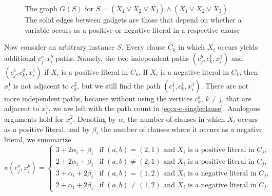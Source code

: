 \documentclass[letterpaper,12pt,headings=normal,parskip=half]{scrartcl}
\theoremstyle{definition}
\begin{document}
\begin{figure}
    \caption{The graph $G(S)$ for $S= (X_1\vee X_2\vee \overline{X}_3)\wedge(\overline{X}_1\vee X_2\vee \overline{X}_3)$. The solid edges between gadgets are those that depend on whether a variable occurs as a positive or negative literal in a respective clause}
    \label{fig:ClauseAndVariables}
\end{figure}%
Now consider an arbitrary instance $S$. Every clause $C_k$ in which $X_i$ occurs yields additional $c_j^a$-$x_i^b$ paths.
Namely, the two independent paths $(c_j^b,c_k^1,x_i^1)$ and $(c_j^b,c_k^2,x_i^1)$ if $X_i$ is a positive literal in $C_k$.
If $X_i$ is a negative literal in $C_k$, then $x_i^1$ is not adjacent to $c_k^2$, but we still find the path $(c_j^1,c_k^1,x_i^1)$.
There are not more independent paths, because without using the vertices $c_k^a$, $k\neq j$, that are adjacent to $x_i^1$, we are left with the path count in \cref{eq:x-c-singleclause}. 
Analogous arguments hold for $x_i^2$.
Denoting by $\alpha_i$ the number of clauses in which $X_i$ occurs as a positive literal, and by $\beta_i$ the number of clauses where it occurs as a negative literal, we summarize
\begin{equation}\label{x-c-multipleclause}
    \kappa(c_j^a,x_i^b)=\begin{cases}
        3+2\alpha_i+\beta_i &\text{if } (a,b)=(2,1) \text{ and } X_i \text{ is a positive literal in } C_j,\\
        2+2\alpha_i+\beta_i &\text{if } (a,b)\neq(2,1) \text{ and } X_i \text{ is a positive literal in } C_j,\\
        3+\alpha_i+2\beta_i &\text{if } (a,b)=(1,2) \text{ and } X_i \text{ is a negative literal in } C_j,\\
        2+\alpha_i+2\beta_i &\text{if } (a,b)\neq(1,2) \text{ and } X_i \text{ is a negative literal in } C_j.
    \end{cases}
\end{equation}
\end{document}
